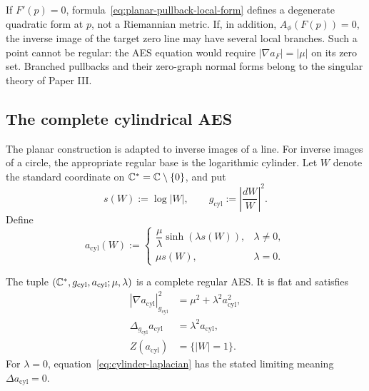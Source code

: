 \begin{warning}
\label{warn:planar-pullback-critical-set}
If \(F'(p)=0\), formula~\eqref{eq:planar-pullback-local-form} defines a degenerate
quadratic form at \(p\), not a Riemannian metric.  If, in addition,
\(A_\phi(F(p))=0\), the inverse image of the target zero line may have several
local branches.  Such a point cannot be regular: the AES equation would require
\(|\nabla a_F|=|\mu|\) on its zero set.  Branched pullbacks and their zero-graph
normal forms belong to the singular theory of Paper III.
\end{warning}

\subsection{The complete cylindrical AES}

The planar construction is adapted to inverse images of a line.  For inverse images
of a circle, the appropriate regular base is the logarithmic cylinder.  Let
\(W\) denote the standard coordinate on \(\mathbb{C}^*=\mathbb{C}\setminus\{0\}\), and put
\begin{equation}\label{eq:cylinder-s-coordinate}
 s(W):=\log|W|,
 \qquad
 g_{\mathrm{cyl}}:=\left|\frac{dW}{W}\right|^2.
\end{equation}
Define
\begin{equation}\label{eq:cylinder-assignment}
 a_{\mathrm{cyl}}(W):=
 \begin{cases}
  \dfrac{\mu}{\lambda}\sinh(\lambda s(W)),&\lambda\ne0,\\[6pt]
  \mu s(W),&\lambda=0.
 \end{cases}
\end{equation}

\begin{proposition}
\label{prop:cylindrical-aes}
The tuple
\((\mathbb{C}^*,g_{\mathrm{cyl}},a_{\mathrm{cyl}};\mu,\lambda)\) is a complete regular
AES.  It is flat and satisfies
\begin{align}
 |\nabla a_{\mathrm{cyl}}|_{g_{\mathrm{cyl}}}^2
 &=\mu^2+\lambda^2a_{\mathrm{cyl}}^2,
 \label{eq:cylinder-eikonal}\\
 \Delta_{g_{\mathrm{cyl}}}a_{\mathrm{cyl}}
 &=\lambda^2a_{\mathrm{cyl}},
 \label{eq:cylinder-laplacian}\\
 Z(a_{\mathrm{cyl}})&=\{|W|=1\}.
 \label{eq:cylinder-zero-circle}
\end{align}
For \(\lambda=0\), equation~\eqref{eq:cylinder-laplacian} has the stated limiting
meaning \(\Delta a_{\mathrm{cyl}}=0\).
\end{proposition}


